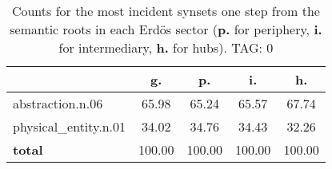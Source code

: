 \begin{table}[h!]
\begin{center}
\begin{tabular}{| l || c | c | c | c |}\hline
 & {\bf g.} & {\bf p.} & {\bf i.} & {\bf h.} \\\hline\hline
abstraction.n.06 & 65.98  & 65.24  & 65.57  & 67.74 \\\hline
physical\_entity.n.01 & 34.02  & 34.76  & 34.43  & 32.26 \\\hline\hline
{{\bf total}} & 100.00  & 100.00  & 100.00  & 100.00 \\\hline
\end{tabular}
\caption{Counts for the most incident synsets one step from the semantic roots in each Erd\"os sector ({\bf p.} for periphery, {\bf i.} for intermediary, {\bf h.} for hubs). TAG: 0}
\end{center}
\end{table}